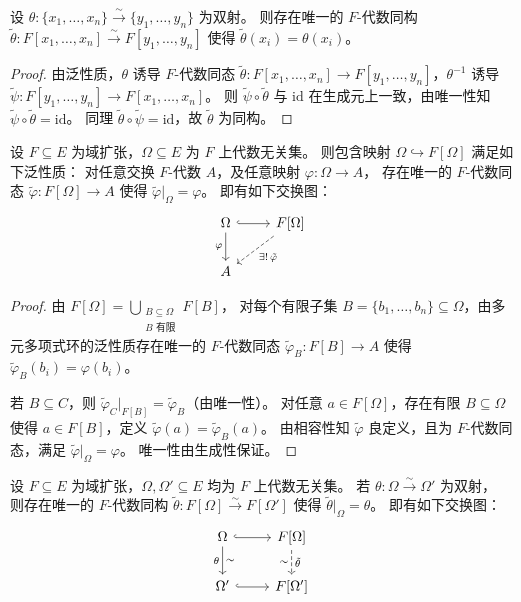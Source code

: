 \documentclass[lang=cn,a4paper,newtx]{elegantbook}
\begin{document}
\begin{corollary}
  设 $\theta\colon\{x_1,\dots,x_n\}\xrightarrow{\sim}\{y_1,\dots,y_n\}$ 为双射。
  则存在唯一的 $F$-代数同构 $\tilde\theta\colon F[x_1,\dots,x_n]\xrightarrow{\sim} F[y_1,\dots,y_n]$ 使得 $\tilde\theta(x_i)=\theta(x_i)$。
\end{corollary}

\begin{proof}
  由泛性质，$\theta$ 诱导 $F$-代数同态 $\tilde\theta\colon F[x_1,\dots,x_n]\to F[y_1,\dots,y_n]$，$\theta^{-1}$ 诱导 $\tilde\psi\colon F[y_1,\dots,y_n]\to F[x_1,\dots,x_n]$。
  则 $\tilde\psi\circ\tilde\theta$ 与 $\mathrm{id}$ 在生成元上一致，由唯一性知 $\tilde\psi\circ\tilde\theta=\mathrm{id}$。
  同理 $\tilde\theta\circ\tilde\psi=\mathrm{id}$，故 $\tilde\theta$ 为同构。
\end{proof}

\begin{proposition}
  设 $F\subseteq E$ 为域扩张，$\Omega\subseteq E$ 为 $F$ 上代数无关集。
  则包含映射 $\Omega\hookrightarrow F[\Omega]$ 满足如下泛性质：
  对任意交换 $F$-代数 $A$，及任意映射 $\varphi\colon\Omega\to A$，
  存在唯一的 $F$-代数同态 $\tilde\varphi\colon F[\Omega]\to A$ 使得 $\tilde\varphi\big|_{\Omega}=\varphi$。
  即有如下交换图：
  \[
    \begin{tikzcd}
      \Omega \arrow[r,hook] \arrow[d,"\varphi"'] & F[\Omega] \arrow[dl,dashed,"\exists!\,\tilde\varphi"] \\
      A
    \end{tikzcd}
  \]
\end{proposition}

\begin{proof}
  由 $F[\Omega]=\bigcup_{\substack{B\subseteq\Omega \\ B\text{ 有限}}}F[B]$，
  对每个有限子集 $B=\{b_1,\dots,b_n\}\subseteq\Omega$，由多元多项式环的泛性质存在唯一的 $F$-代数同态
  $\tilde\varphi_B\colon F[B]\to A$ 使得 $\tilde\varphi_B(b_i)=\varphi(b_i)$。

  若 $B\subseteq C$，则 $\tilde\varphi_C\big|_{F[B]}=\tilde\varphi_B$（由唯一性）。
  对任意 $a\in F[\Omega]$，存在有限 $B\subseteq\Omega$ 使得 $a\in F[B]$，定义 $\tilde\varphi(a)=\tilde\varphi_B(a)$。
  由相容性知 $\tilde\varphi$ 良定义，且为 $F$-代数同态，满足 $\tilde\varphi\big|_{\Omega}=\varphi$。
  唯一性由生成性保证。
\end{proof}

\begin{corollary}
  设 $F\subseteq E$ 为域扩张，$\Omega,\Omega'\subseteq E$ 均为 $F$ 上代数无关集。
  若 $\theta\colon\Omega\xrightarrow{\sim}\Omega'$ 为双射，
  则存在唯一的 $F$-代数同构 $\tilde\theta\colon F[\Omega]\xrightarrow{\sim} F[\Omega']$ 使得 $\tilde\theta\big|_{\Omega}=\theta$。
  即有如下交换图：
  \[
    \begin{tikzcd}
      \Omega \arrow[r,hook] \arrow[d,"\theta"',"\sim"] & F[\Omega] \arrow[d,dashed,"\tilde\theta","\sim"'] \\
      \Omega' \arrow[r,hook] & F[\Omega']
    \end{tikzcd}
  \]
\end{corollary}
\end{document}
